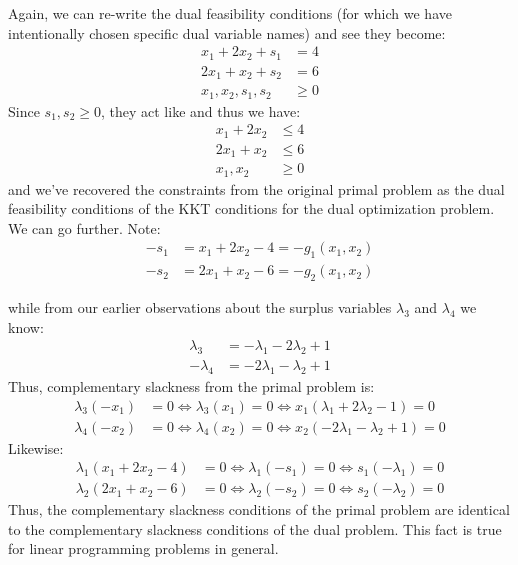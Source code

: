 Again, we can re-write the dual feasibility conditions (for which we have intentionally chosen specific dual variable names) and see they become:
\begin{equation}
\begin{aligned}
x_1 + 2x_2 + s_1 &= 4\\
2x_1 + x_2 + s_2 & =6\\
x_1,x_2, s_1, s_2 &\geq 0
\end{aligned}
\end{equation}
Since $s_1, s_2 \geq 0$, they act like  and thus we have:
\begin{equation}
\begin{aligned}
x_1 + 2x_2 &\leq  4\\
2x_1 + x_2 &\leq 6\\
x_1,x_2&\geq 0
\end{aligned}
\end{equation}
and we've recovered the constraints from the original primal problem as the dual feasibility conditions of the KKT conditions for the dual optimization problem. We can go further. Note:
\begin{equation}
    \begin{aligned}
        -s_1 &= x_1 + 2x_2 - 4= -g_1(x_1,x_2)\\
-s_2 &= 2x_1 + x_2 -6 = -g_2(x_1,x_2)
    \end{aligned}
\end{equation}

while from our earlier observations about the surplus variables $\lambda_3$ and $\lambda_4$ we know:
\begin{equation}
    \begin{aligned}
        \lambda_3 &= -\lambda_1 - 2\lambda_2 + 1\\
    -\lambda_4 &= -2\lambda_1 - \lambda_2 + 1
    \end{aligned}
\end{equation}
Thus, complementary slackness from the primal problem is:
\begin{equation}
\begin{aligned}
    \lambda_3(-x_1) &= 0 \iff \lambda_3(x_1) =0  \iff 
	x_1(\lambda_1 + 2\lambda_2 - 1) = 0\\
\lambda_4(-x_2) &= 0 \iff \lambda_4(x_2) =0 \iff x_2(-2\lambda_1 - \lambda_2 + 1) = 0
\end{aligned}
\end{equation}
Likewise:
\begin{equation}
    \begin{aligned}
        \lambda_1(x_1 + 2x_2 - 4) &=0 \iff \lambda_1(-s_1) = 0 \iff s_1(-\lambda_1) = 0\\
\lambda_2(2x_1 + x_2 - 6) &=0 \iff \lambda_2(-s_2) = 0 \iff s_2(-\lambda_2) = 0
    \end{aligned}
\end{equation}
Thus, the complementary slackness conditions of the primal problem are identical to the complementary slackness conditions of the dual problem. This fact is true for linear programming problems in general.

